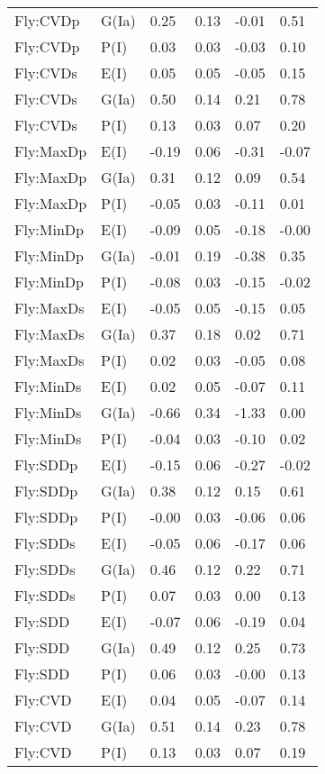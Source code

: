 \begin{center}
\begin{longtable}{|p{1.1in}|p{0.7in}|p{0.7in}|p{0.6in}|p{0.6in}|p{0.6in}|}
  Fly:CVDp & G(Ia) & 0.25 & 0.13 & -0.01 & 0.51 \\ 
  Fly:CVDp & P(I) & 0.03 & 0.03 & -0.03 & 0.10 \\ 
  Fly:CVDs & E(I) & 0.05 & 0.05 & -0.05 & 0.15 \\ 
  Fly:CVDs & G(Ia) & 0.50 & 0.14 & 0.21 & 0.78 \\ 
  Fly:CVDs & P(I) & 0.13 & 0.03 & 0.07 & 0.20 \\ 
  Fly:MaxDp & E(I) & -0.19 & 0.06 & -0.31 & -0.07 \\ 
  Fly:MaxDp & G(Ia) & 0.31 & 0.12 & 0.09 & 0.54 \\ 
  Fly:MaxDp & P(I) & -0.05 & 0.03 & -0.11 & 0.01 \\ 
  Fly:MinDp & E(I) & -0.09 & 0.05 & -0.18 & -0.00 \\ 
  Fly:MinDp & G(Ia) & -0.01 & 0.19 & -0.38 & 0.35 \\ 
  Fly:MinDp & P(I) & -0.08 & 0.03 & -0.15 & -0.02 \\ 
  Fly:MaxDs & E(I) & -0.05 & 0.05 & -0.15 & 0.05 \\ 
  Fly:MaxDs & G(Ia) & 0.37 & 0.18 & 0.02 & 0.71 \\ 
  Fly:MaxDs & P(I) & 0.02 & 0.03 & -0.05 & 0.08 \\ 
  Fly:MinDs & E(I) & 0.02 & 0.05 & -0.07 & 0.11 \\ 
  Fly:MinDs & G(Ia) & -0.66 & 0.34 & -1.33 & 0.00 \\ 
  Fly:MinDs & P(I) & -0.04 & 0.03 & -0.10 & 0.02 \\ 
  Fly:SDDp & E(I) & -0.15 & 0.06 & -0.27 & -0.02 \\ 
  Fly:SDDp & G(Ia) & 0.38 & 0.12 & 0.15 & 0.61 \\ 
  Fly:SDDp & P(I) & -0.00 & 0.03 & -0.06 & 0.06 \\ 
  Fly:SDDs & E(I) & -0.05 & 0.06 & -0.17 & 0.06 \\ 
  Fly:SDDs & G(Ia) & 0.46 & 0.12 & 0.22 & 0.71 \\ 
  Fly:SDDs & P(I) & 0.07 & 0.03 & 0.00 & 0.13 \\ 
  Fly:SDD & E(I) & -0.07 & 0.06 & -0.19 & 0.04 \\ 
  Fly:SDD & G(Ia) & 0.49 & 0.12 & 0.25 & 0.73 \\ 
  Fly:SDD & P(I) & 0.06 & 0.03 & -0.00 & 0.13 \\ 
  Fly:CVD & E(I) & 0.04 & 0.05 & -0.07 & 0.14 \\ 
  Fly:CVD & G(Ia) & 0.51 & 0.14 & 0.23 & 0.78 \\ 
  Fly:CVD & P(I) & 0.13 & 0.03 & 0.07 & 0.19 \\ 

\end{longtable}
\end{center}
